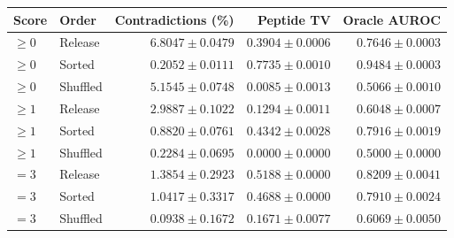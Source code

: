 \begin{tabular}{llrrr}
\toprule
Score & Order & Contradictions (\%) & Peptide TV & Oracle AUROC\\
\midrule
$\geq0$ & Release & $6.8047\pm0.0479$ & $0.3904\pm0.0006$ & $0.7646\pm0.0003$\\
$\geq0$ & Sorted & $0.2052\pm0.0111$ & $0.7735\pm0.0010$ & $0.9484\pm0.0003$\\
$\geq0$ & Shuffled & $5.1545\pm0.0748$ & $0.0085\pm0.0013$ & $0.5066\pm0.0010$\\
$\geq1$ & Release & $2.9887\pm0.1022$ & $0.1294\pm0.0011$ & $0.6048\pm0.0007$\\
$\geq1$ & Sorted & $0.8820\pm0.0761$ & $0.4342\pm0.0028$ & $0.7916\pm0.0019$\\
$\geq1$ & Shuffled & $0.2284\pm0.0695$ & $0.0000\pm0.0000$ & $0.5000\pm0.0000$\\
$=3$ & Release & $1.3854\pm0.2923$ & $0.5188\pm0.0000$ & $0.8209\pm0.0041$\\
$=3$ & Sorted & $1.0417\pm0.3317$ & $0.4688\pm0.0000$ & $0.7910\pm0.0024$\\
$=3$ & Shuffled & $0.0938\pm0.1672$ & $0.1671\pm0.0077$ & $0.6069\pm0.0050$\\
\bottomrule
\end{tabular}
